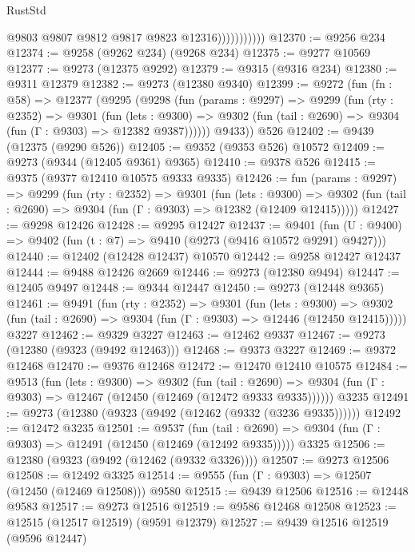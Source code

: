 \begin{lexlean}{RustStd}
\begin{coremodule}
{\begin{coremodule}
{{{{{{{{{{{{{{{{{{{{{{{{{{{{{{{{{{{{{{{{{{{{{{{{{{{{{{{                          @9803
                          @9807
                          @9812
                          @9817
                          @9823
                          @12316)))))))))))
@12370 := @9256 @234
@12374 := @9258 (@9262 @234) (@9268 @234)
@12375 := @9277 @10569
@12377 := @9273 (@12375 @9292)
@12379 := @9315 (@9316 @234)
@12380 := @9311 @12379
@12382 := @9273 (@12380 @9340)
@12399 := @9272
    (fun (fn : @58) =>
    @12377
      (@9295
        (@9298
          (fun (params : @9297) =>
          @9299
            (fun (rty : @2352) =>
            @9301
              (fun (lets : @9300) =>
              @9302 (fun (tail : @2690) => @9304 (fun (Γ : @9303) => @12382 @9387))))))
        @9433))
    @526
@12402 := @9439 (@12375 (@9290 @526))
@12405 := @9352 (@9353 @526) @10572
@12409 := @9273 (@9344 (@12405 @9361) @9365)
@12410 := @9378 @526
@12415 := @9375 (@9377 @12410 @10575 @9333 @9335)
@12426 := fun (params : @9297) =>
  @9299
    (fun (rty : @2352) =>
    @9301
      (fun (lets : @9300) =>
      @9302 (fun (tail : @2690) => @9304 (fun (Γ : @9303) => @12382 (@12409 @12415)))))
@12427 := @9298 @12426
@12428 := @9295 @12427
@12437 := @9401
    (fun (U : @9400) => @9402 (fun (t : @7) => @9410 (@9273 (@9416 @10572 @9291) @9427)))
@12440 := @12402 (@12428 @12437) @10570
@12442 := @9258 @12427 @12437
@12444 := @9488 @12426 @2669
@12446 := @9273 (@12380 @9494)
@12447 := @12405 @9497
@12448 := @9344 @12447
@12450 := @9273 (@12448 @9365)
@12461 := @9491
    (fun (rty : @2352) =>
    @9301
      (fun (lets : @9300) =>
      @9302 (fun (tail : @2690) => @9304 (fun (Γ : @9303) => @12446 (@12450 @12415)))))
    @3227
@12462 := @9329 @3227
@12463 := @12462 @9337
@12467 := @9273 (@12380 (@9323 (@9492 @12463)))
@12468 := @9373 @3227
@12469 := @9372 @12468
@12470 := @9376 @12468
@12472 := @12470 @12410 @10575
@12484 := @9513
    (fun (lets : @9300) =>
    @9302
      (fun (tail : @2690) =>
      @9304 (fun (Γ : @9303) => @12467 (@12450 (@12469 (@12472 @9333 @9335))))))
    @3235
@12491 := @9273 (@12380 (@9323 (@9492 (@12462 (@9332 (@3236 @9335))))))
@12492 := @12472 @3235
@12501 := @9537
    (fun (tail : @2690) => @9304 (fun (Γ : @9303) => @12491 (@12450 (@12469 (@12492 @9335)))))
    @3325
@12506 := @12380 (@9323 (@9492 (@12462 (@9332 @3326))))
@12507 := @9273 @12506
@12508 := @12492 @3325
@12514 := @9555 (fun (Γ : @9303) => @12507 (@12450 (@12469 @12508))) @9580
@12515 := @9439 @12506
@12516 := @12448 @9583
@12517 := @9273 @12516
@12519 := @9586 @12468 @12508
@12523 := @12515 (@12517 @12519) (@9591 @12379)
@12527 := @9439 @12516 @12519 (@9596 @12447)
}}}}}}}}}}}}}}}}}}}}}}}}}}}}}}}}}}}}}}}}}}}}}}}}}}}}}}}
\end{coremodule}}
\end{coremodule}
\end{lexlean}
